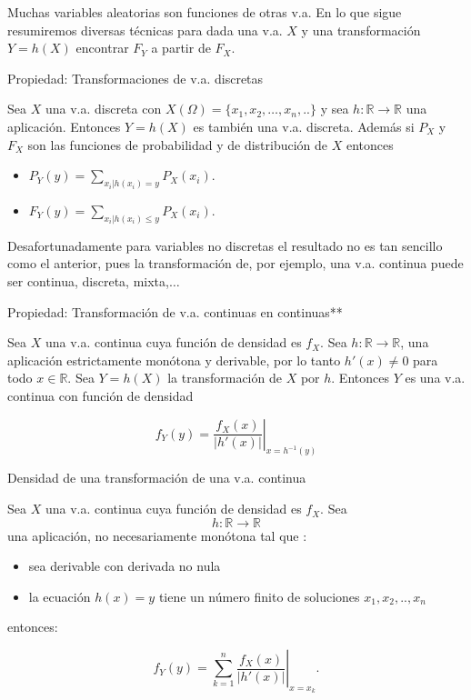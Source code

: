 \documentclass[
  letterpaper,
  DIV=11,
  numbers=noendperiod]{scrreprt}
\providecommand{\tightlist}{%
  \setlength{\itemsep}{0pt}\setlength{\parskip}{0pt}}\usepackage{longtable,booktabs,array}
\begin{document}
Muchas variables aleatorias son funciones de otras v.a. En lo que sigue
resumiremos diversas técnicas para dada una v.a. \(X\) y una
transformación \(Y=h(X)\) encontrar \(F_{Y}\) a partir de \(F_{X}\).

Propiedad: Transformaciones de v.a. discretas

Sea \(X\) una v.a. discreta con
\(X(\Omega)=\{x_1,x_2,\ldots,x_{n},..\}\) y sea
\(h:\mathbb{R}\to\mathbb{R}\) una aplicación. Entonces \(Y=h(X)\) es
también una v.a. discreta. Además si \(P_X\) y \(F_{X}\) son las
funciones de probabilidad y de distribución de \(X\) entonces

\begin{itemize}
\tightlist
\item
  \(\displaystyle P_{Y}(y)=\sum_{x_{i}|h(x_{i})=y}P_X(x_{i}).\)
\item
  \(\displaystyle F_{Y}(y)=\sum_{x_{i}|h(x_{i})\leq y} P_X(x_{i}).\)
\end{itemize}

Desafortunadamente para variables no discretas el resultado no es tan
sencillo como el anterior, pues la transformación de, por ejemplo, una
v.a. continua puede ser continua, discreta, mixta,\(\ldots\)

Propiedad: Transformación de v.a. continuas en continuas**

Sea \(X\) una v.a. continua cuya función de densidad es \(f_{X}\). Sea
\(h:\mathbb{R}\to\mathbb{R}\), una aplicación estrictamente monótona y
derivable, por lo tanto \(h'(x)\not=0\) para todo \(x\in\mathbb{R}\).
Sea \(Y=h(X)\) la transformación de \(X\) por \(h\). Entonces \(Y\) es
una v.a. continua con función de densidad

\[f_{Y}(y)=\left.\frac{f_{X}(x)}
{\left|h'(x)\right|}\right|_{x=h^{-1}(y)}\]

Densidad de una transformación de una v.a. continua

Sea \(X\) una v.a. continua cuya función de densidad es \(f_{X}\). Sea
\[h:\mathbb{R}\to\mathbb{R}\] una aplicación, no necesariamente monótona
tal que :

\begin{itemize}
\tightlist
\item
  sea derivable con derivada no nula
\item
  la ecuación \(h(x)=y\) tiene un número finito de soluciones
  \(x_1,x_2,..,x_{n}\)
\end{itemize}

entonces:

\[
\displaystyle f_{Y}(y)=\left.\sum_{k=1}^{n} \frac{f_{X}(x)}
{\left|h'(x)\right|}\right|_{x=x_{k}}.
\]
\end{document}
